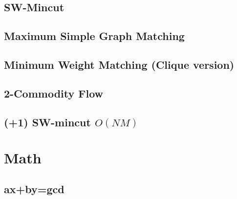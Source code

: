 \documentclass[10pt,twocolumn,oneside]{article}
\begin{document}
\subsection{SW-Mincut}


\subsection{Maximum Simple Graph Matching}


\subsection{Minimum Weight Matching (Clique version)}


%


\subsection{2-Commodity Flow}


%

\subsection{(+1) SW-mincut $O(NM)$}


\section{Math}
\subsection{ax+by=gcd}


%
\end{document}
